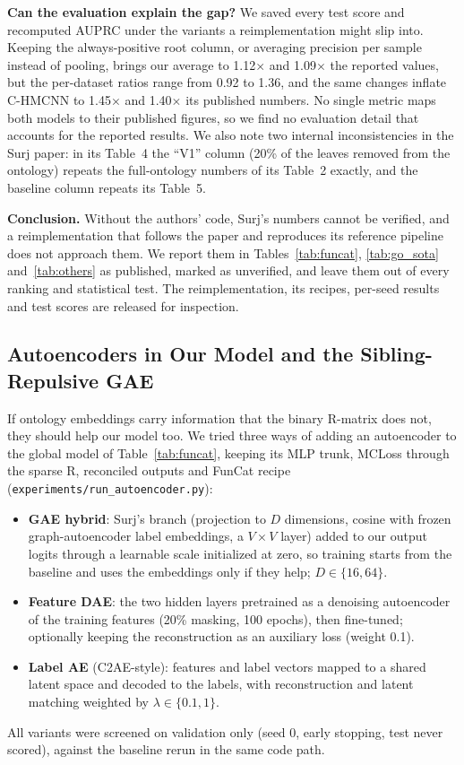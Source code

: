 \documentclass[preprint,12pt]{elsarticle}
\begin{document}
\textbf{Can the evaluation explain the gap?}  We saved every test score
and recomputed AUPRC under the variants a reimplementation might slip
into.  Keeping the always-positive root column, or averaging precision
per sample instead of pooling, brings our average to 1.12$\times$ and
1.09$\times$ the reported values, but the per-dataset ratios range from
0.92 to 1.36, and the same changes inflate C-HMCNN to 1.45$\times$ and
1.40$\times$ its published numbers.  No single metric maps both models
to their published figures, so we find no evaluation detail that
accounts for the reported results.  We also note two internal
inconsistencies in the Surj paper: in its Table~4 the ``V1'' column
(20\% of the leaves removed from the ontology) repeats the full-ontology
numbers of its Table~2 exactly, and the baseline column repeats its
Table~5.

\textbf{Conclusion.}  Without the authors' code, Surj's numbers cannot be
verified, and a reimplementation that follows the paper and reproduces
its reference pipeline does not approach them.  We report them in
Tables~\ref{tab:funcat}, \ref{tab:go_sota} and~\ref{tab:others} as
published, marked as unverified, and leave them out of every ranking and
statistical test.  The reimplementation, its recipes, per-seed results
and test scores are released for inspection.

\subsection{Autoencoders in Our Model and the Sibling-Repulsive GAE}
\label{sec:autoenc}

If ontology embeddings carry information that the binary R-matrix does
not, they should help our model too.  We tried three ways of adding an
autoencoder to the global model of Table~\ref{tab:funcat}, keeping its
MLP trunk, MCLoss through the sparse R, reconciled outputs and FunCat
recipe (\texttt{experiments/run\_autoencoder.py}):
\begin{itemize}
  \item \textbf{GAE hybrid}: Surj's branch (projection to $D$
    dimensions, cosine with frozen graph-autoencoder label embeddings,
    a $V{\times}V$ layer) added to our output logits through a learnable
    scale initialized at zero, so training starts from the baseline and
    uses the embeddings only if they help; $D\in\{16,64\}$.
  \item \textbf{Feature DAE}: the two hidden layers pretrained as a
    denoising autoencoder of the training features (20\% masking, 100
    epochs), then fine-tuned; optionally keeping the reconstruction as an
    auxiliary loss (weight 0.1).
  \item \textbf{Label AE} (C2AE-style): features and label vectors
    mapped to a shared latent space and decoded to the labels, with
    reconstruction and latent matching weighted by
    $\lambda\in\{0.1,1\}$.
\end{itemize}
All variants were screened on validation only (seed 0, early stopping,
test never scored), against the baseline rerun in the same code path.
\end{document}
